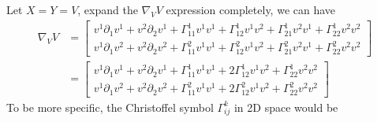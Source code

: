 \documentclass{article}
\theoremstyle{definition}
\theoremstyle{plain}
\begin{document}
Let $X=Y=V$, expand the $\nabla_VV$ expression completely, we can have
\begin{align}
    \nabla_V V&=\left[\begin{array}{c}
        v^1\partial_1 v^1+v^2\partial_2 v^1+\Gamma_{11}^1v^1v^1+\Gamma_{12}^1v^1v^2+\Gamma_{21}^1v^2v^1+\Gamma_{22}^1v^2v^2 \\
        v^1\partial_1 v^2+v^2\partial_2 v^2+\Gamma_{11}^2v^1v^1+\Gamma_{12}^2v^1v^2+\Gamma_{21}^2v^2v^1+\Gamma_{22}^2v^2v^2
    \end{array}\right]\\ \nonumber
    &=
    \left[\begin{array}{c}
    v^1\partial_1 v^1+v^2\partial_2 v^1+\Gamma_{11}^1v^1v^1+2\Gamma_{12}^1v^1v^2+\Gamma_{22}^1v^2v^2\\
    v^1\partial_1 v^2+v^2\partial_2 v^2+\Gamma_{11}^2v^1v^1+2\Gamma_{12}^2v^1v^2+\Gamma_{22}^2v^2v^2
    \end{array}\right]
\end{align}
To be more specific, the Christoffel symbol $\Gamma_{ij}^k$ in 2D space would be
\end{document}
